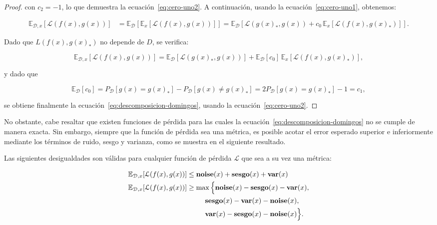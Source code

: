 \begin{proof}
    con $c_2 = -1$, lo que demuestra la ecuación~\eqref{eq:cero-uno2}. A continuación, usando la ecuación~\eqref{eq:cero-uno1}, obtenemos:

    \begin{align}
        \mathbb{E}_{\mathcal{D}, x}[\mathcal{L}(f(x), g(x))] &= \mathbb{E}_\mathcal{D}[\mathbb{E}_{x}[\mathcal{L}(f(x), g(x))]] = \mathbb{E}_\mathcal{D}[\mathcal{L}(g(x)_*, g(x)) + c_0 \, \mathbb{E}_{x}[\mathcal{L}(f(x), g(x)_*)]].
    \end{align}

    Dado que $L(f(x), g(x)_*)$ no depende de $D$, se verifica:

    \begin{equation}
        \mathbb{E}_{\mathcal{D}, x}[\mathcal{L}(f(x), g(x))] = \mathbb{E}_\mathcal{D}[\mathcal{L}(g(x)_*, g(x))] + \mathbb{E}_\mathcal{D}[c_0] \, \mathbb{E}_{x}[\mathcal{L}(f(x), g(x)_*)],
    \end{equation}

    y dado que

    \begin{equation}
        \mathbb{E}_\mathcal{D}[c_0] = P_\mathcal{D}[g(x) = g(x)_*] - P_\mathcal{D}[g(x) \neq g(x)_*] = 2P_\mathcal{D}[g(x) = g(x)_*] - 1 = c_1,
    \end{equation}

    se obtiene finalmente la ecuación~\eqref{eq:descomposicion-domingos}, usando la ecuación~\eqref{eq:cero-uno2}.
\end{proof}

No obstante, cabe resaltar que existen funciones de pérdida para las cuales la ecuación~\eqref{eq:descomposicion-domingos} no se cumple de manera exacta. Sin embargo, siempre que la función de pérdida sea una métrica, es posible acotar el error esperado superior e inferiormente mediante los términos de ruido, sesgo y varianza, como se muestra en el siguiente resultado.

\begin{teorema}
    Las siguientes desigualdades son válidas para cualquier función de pérdida $\mathcal{L}$ que sea a su vez una métrica:

    \begin{align}
        \mathbb{E}_{\mathcal{D}, x}[\mathcal{L}(f(x), g(x))] 
        &\leq \textbf{noise}(x) + \textbf{sesgo}(x) + \textbf{var}(x) \\
        \mathbb{E}_{\mathcal{D}, x}[\mathcal{L}(f(x), g(x))] 
        &\geq \max\Big\{
            \textbf{noise}(x) - \textbf{sesgo}(x) - \textbf{var}(x), \notag \\
            &\hspace{2.6em}
            \textbf{sesgo}(x) - \textbf{var}(x) - \textbf{noise}(x), \notag \\
            &\hspace{2.6em}
            \textbf{var}(x) - \textbf{sesgo}(x) - \textbf{noise}(x)
        \Big\}.
    \end{align}
\end{teorema}

